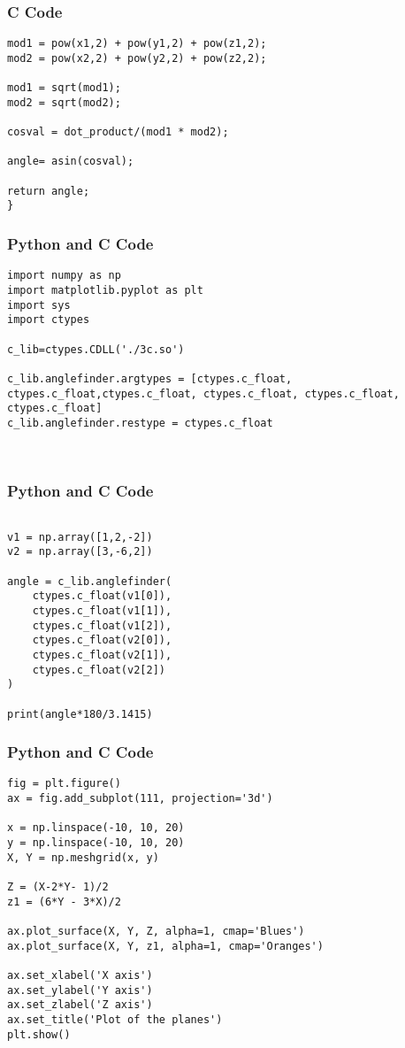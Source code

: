 \documentclass{beamer}
\begin{document}
\begin{frame}[fragile]
\frametitle{C Code}
\begin{lstlisting}
mod1 = pow(x1,2) + pow(y1,2) + pow(z1,2);    
mod2 = pow(x2,2) + pow(y2,2) + pow(z2,2);
    
mod1 = sqrt(mod1);
mod2 = sqrt(mod2);
   
cosval = dot_product/(mod1 * mod2);

angle= asin(cosval);

return angle;
}

\end{lstlisting}

\end{frame}


\begin{frame}[fragile]
\frametitle{Python and C Code}

\begin{lstlisting}
import numpy as np
import matplotlib.pyplot as plt
import sys
import ctypes

c_lib=ctypes.CDLL('./3c.so')

c_lib.anglefinder.argtypes = [ctypes.c_float, ctypes.c_float,ctypes.c_float, ctypes.c_float, ctypes.c_float, ctypes.c_float]
c_lib.anglefinder.restype = ctypes.c_float



\end{lstlisting}

\end{frame}

\begin{frame}[fragile]
\frametitle{Python and C Code}
\begin{lstlisting}

v1 = np.array([1,2,-2])
v2 = np.array([3,-6,2])

angle = c_lib.anglefinder(
    ctypes.c_float(v1[0]),
    ctypes.c_float(v1[1]), 
    ctypes.c_float(v1[2]),
    ctypes.c_float(v2[0]), 
    ctypes.c_float(v2[1]),
    ctypes.c_float(v2[2])
)

print(angle*180/3.1415)

\end{lstlisting}

\end{frame}

\begin{frame}[fragile]
    \frametitle{Python and C Code}

    \begin{lstlisting}
fig = plt.figure()
ax = fig.add_subplot(111, projection='3d')

x = np.linspace(-10, 10, 20)
y = np.linspace(-10, 10, 20)
X, Y = np.meshgrid(x, y)

Z = (X-2*Y- 1)/2
z1 = (6*Y - 3*X)/2

ax.plot_surface(X, Y, Z, alpha=1, cmap='Blues')
ax.plot_surface(X, Y, z1, alpha=1, cmap='Oranges')

ax.set_xlabel('X axis')
ax.set_ylabel('Y axis')
ax.set_zlabel('Z axis')
ax.set_title('Plot of the planes')
plt.show()

    \end{lstlisting}
\end{frame}
\end{document}
